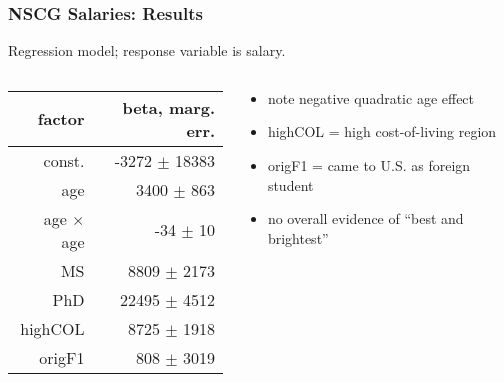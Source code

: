 \documentclass{beamer}
\begin{document}
\begin{frame}
\frametitle{NSCG Salaries: Results}

\pause

Regression model; response variable is salary.
\pause

\medskip

\begin{columns}

  \begin{column}{0.5\textwidth}
   \begin{tabular}{|r|r|}
   \hline
   factor & beta, marg. err.  \\ \hline
   \hline
   const. & -3272 {\footnotesize $\pm$ 18383} \\ \hline
   age & 3400 {\footnotesize $\pm$ 863} \\ \hline
   age $\times$ age & -34 {\footnotesize $\pm$ 10} \\ \hline
   MS & 8809 {\footnotesize $\pm$ 2173} \\ \hline
   PhD & 22495 {\footnotesize $\pm$ 4512} \\ \hline
   highCOL & 8725 {\footnotesize $\pm$ 1918} \\ \hline
   origF1 & 808 {\footnotesize $\pm$ 3019} \\ \hline
   \end{tabular}
  \end{column}
  
  \begin{column}{0.5\textwidth}
  \pause
  \begin{itemize}
  \item note negative quadratic age effect
  \pause
  \item highCOL = high cost-of-living region
  \pause
  \item origF1 = came to U.S. as foreign student
  \pause
  \item no overall evidence of ``best and brightest''
  \end{itemize}
  \end{column}

\end{columns}

\end{frame}
\end{document}
